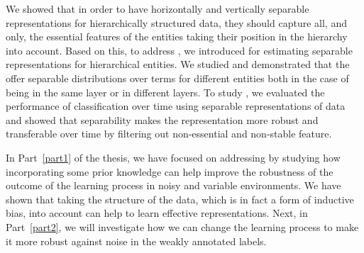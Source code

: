 We showed that in order to have horizontally and vertically separable representations for hierarchically structured data, they should capture all, and only, the essential features of the entities taking their position in the hierarchy into account. Based on this, to address \textbf{}, we introduced \hswlms for estimating separable representations for hierarchical entities. We studied \achswlms and demonstrated that the offer separable distributions over terms for different entities both in the case of being in the same layer or in different layers. To study \textbf{}, we evaluated the performance of classification over time using separable representations of data and showed that separability makes the representation more robust and transferable over time by filtering out non-essential and non-stable feature.

\bigskip
In Part~\ref{part1} of the thesis, we have focused on addressing \textbf{} by studying how incorporating some prior knowledge can help improve the robustness of the outcome of the learning process in noisy and variable environments. We have shown that taking the structure of the data, which is in fact a form of inductive bias, into account can help to learn effective representations. Next, in Part~\ref{part2}, we will investigate how we can change the learning process to make it more robust against noise in the weakly annotated labels.